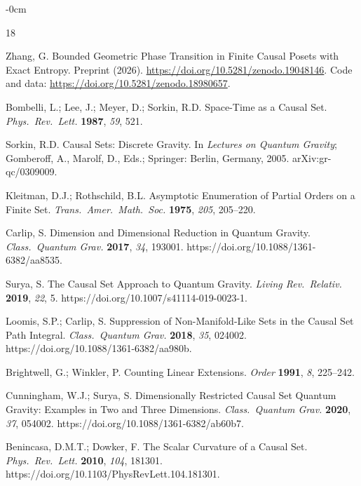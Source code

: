 \documentclass[entropy,article,submit,pdftex,moreauthors]{Definitions/mdpi}
\begin{document}
\begin{adjustwidth}{-\extralength}{0cm}


\begin{thebibliography}{18}

Zhang, G.
Bounded Geometric Phase Transition in Finite Causal Posets with Exact Entropy.
Preprint (2026). \url{https://doi.org/10.5281/zenodo.19048146}.
Code and data: \url{https://doi.org/10.5281/zenodo.18980657}.

Bombelli, L.; Lee, J.; Meyer, D.; Sorkin, R.D.
Space-Time as a Causal Set.
\textit{Phys.\ Rev.\ Lett.} \textbf{1987}, \textit{59}, 521.

Sorkin, R.D.
Causal Sets: Discrete Gravity.
In \textit{Lectures on Quantum Gravity}; Gomberoff, A., Marolf, D., Eds.; Springer: Berlin, Germany, 2005.
arXiv:gr-qc/0309009.

Kleitman, D.J.; Rothschild, B.L.
Asymptotic Enumeration of Partial Orders on a Finite Set.
\textit{Trans.\ Amer.\ Math.\ Soc.} \textbf{1975}, \textit{205}, 205--220.

Carlip, S.
Dimension and Dimensional Reduction in Quantum Gravity.
\textit{Class.\ Quantum Grav.} \textbf{2017}, \textit{34}, 193001.
https://doi.org/10.1088/1361-6382/aa8535.

Surya, S.
The Causal Set Approach to Quantum Gravity.
\textit{Living Rev.\ Relativ.} \textbf{2019}, \textit{22}, 5.
https://doi.org/10.1007/s41114-019-0023-1.

Loomis, S.P.; Carlip, S.
Suppression of Non-Manifold-Like Sets in the Causal Set Path Integral.
\textit{Class.\ Quantum Grav.} \textbf{2018}, \textit{35}, 024002.
https://doi.org/10.1088/1361-6382/aa980b.

Brightwell, G.; Winkler, P.
Counting Linear Extensions.
\textit{Order} \textbf{1991}, \textit{8}, 225--242.

Cunningham, W.J.; Surya, S.
Dimensionally Restricted Causal Set Quantum Gravity: Examples in Two and Three Dimensions.
\textit{Class.\ Quantum Grav.} \textbf{2020}, \textit{37}, 054002.
https://doi.org/10.1088/1361-6382/ab60b7.

Benincasa, D.M.T.; Dowker, F.
The Scalar Curvature of a Causal Set.
\textit{Phys.\ Rev.\ Lett.} \textbf{2010}, \textit{104}, 181301.
https://doi.org/10.1103/PhysRevLett.104.181301.


\end{thebibliography}
\end{adjustwidth}
\end{document}
